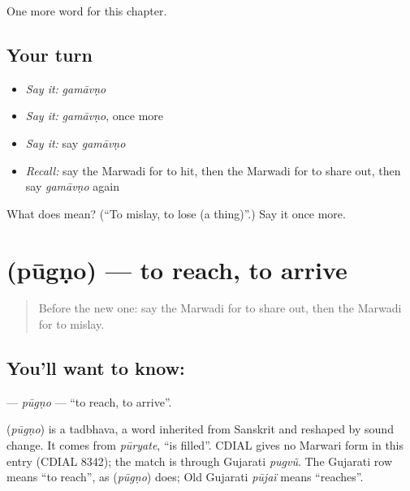 \begin{grammarlens}[title={What you've built}]
One more word for this chapter.
\end{grammarlens}

\subsection*{Your turn}
\begin{itemize}
\raggedright
  \item \emph{Say it:} \emph{gamāvṇo}
  \item \emph{Say it:} \emph{gamāvṇo}, once more
  \item \emph{Say it:} say \emph{gamāvṇo}
  \item \emph{Recall:} say the Marwadi for to hit, then the Marwadi for to share out, then say \emph{gamāvṇo} again
\end{itemize}

\begin{tcolorbox}[breakable,colback=teal!4,colframe=teal!35!black,title={Before you move on}]
What does  mean? (\textquotedblleft{}To mislay, to lose (a thing)\textquotedblright{}.) Say it once more.
\end{tcolorbox}
\section[\texorpdfstring{\mw{पूगणो} (pūgṇo)}{पूगणो (pūgṇo)}]{ (pūgṇo) — to reach, to arrive}

\label{lesson:MW-C110-pugno}



\begin{quote}
Before the new one: say the Marwadi for to share out, then the Marwadi for to mislay.
\end{quote}

\subsection*{You'll want to know: }
\textbf{} — \emph{pūgṇo} — \textquotedblleft{}to reach, to arrive\textquotedblright{}.

\begin{cousinweb}
\textbf{} (\emph{pūgṇo}) is a tadbhava, a word inherited from Sanskrit and reshaped by sound change. It comes from \emph{pūryate}, \textquotedblleft{}is filled\textquotedblright{}. CDIAL gives no Marwari form in this entry (CDIAL 8342); the match is through Gujarati \emph{pugvũ}. The Gujarati row means \textquotedblleft{}to reach\textquotedblright{}, as \textbf{} (\emph{pūgṇo}) does; Old Gujarati \emph{pūjaï} means \textquotedblleft{}reaches\textquotedblright{}.
\end{cousinweb}

